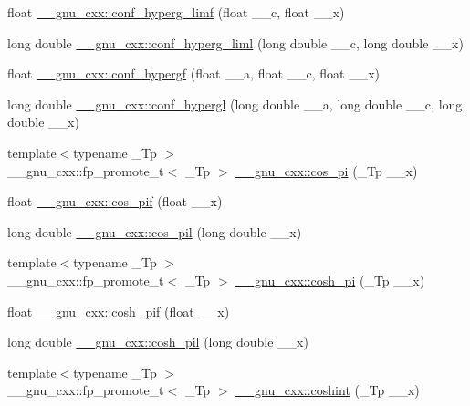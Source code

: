 \begin{DoxyCompactItemize}
\item 
float \hyperlink{group__gnu__math__spec__func_ga609879a370bc4e9fc70563806bc49cb9}{\+\_\+\+\_\+gnu\+\_\+cxx\+::conf\+\_\+hyperg\+\_\+limf} (float \+\_\+\+\_\+c, float \+\_\+\+\_\+x)
\item 
long double \hyperlink{group__gnu__math__spec__func_ga367be9b77eb1f9ccc2971d5300da48d1}{\+\_\+\+\_\+gnu\+\_\+cxx\+::conf\+\_\+hyperg\+\_\+liml} (long double \+\_\+\+\_\+c, long double \+\_\+\+\_\+x)
\item 
float \hyperlink{group__gnu__math__spec__func_gabd18e600aa78c3f2b2f835039506c810}{\+\_\+\+\_\+gnu\+\_\+cxx\+::conf\+\_\+hypergf} (float \+\_\+\+\_\+a, float \+\_\+\+\_\+c, float \+\_\+\+\_\+x)
\item 
long double \hyperlink{group__gnu__math__spec__func_ga0a9853f30d8fa515a12cd45a92da832e}{\+\_\+\+\_\+gnu\+\_\+cxx\+::conf\+\_\+hypergl} (long double \+\_\+\+\_\+a, long double \+\_\+\+\_\+c, long double \+\_\+\+\_\+x)
\item 
{\footnotesize template$<$typename \+\_\+\+Tp $>$ }\\\+\_\+\+\_\+gnu\+\_\+cxx\+::fp\+\_\+promote\+\_\+t$<$ \+\_\+\+Tp $>$ \hyperlink{group__gnu__math__spec__func_gafc4698ae591b0e9e61285b0794d43ef4}{\+\_\+\+\_\+gnu\+\_\+cxx\+::cos\+\_\+pi} (\+\_\+\+Tp \+\_\+\+\_\+x)
\item 
float \hyperlink{group__gnu__math__spec__func_gaddcae99c1572af6fa1d79b9cfa053033}{\+\_\+\+\_\+gnu\+\_\+cxx\+::cos\+\_\+pif} (float \+\_\+\+\_\+x)
\item 
long double \hyperlink{group__gnu__math__spec__func_ga9b6816c0abf30fd88417d79a33cb5465}{\+\_\+\+\_\+gnu\+\_\+cxx\+::cos\+\_\+pil} (long double \+\_\+\+\_\+x)
\item 
{\footnotesize template$<$typename \+\_\+\+Tp $>$ }\\\+\_\+\+\_\+gnu\+\_\+cxx\+::fp\+\_\+promote\+\_\+t$<$ \+\_\+\+Tp $>$ \hyperlink{group__gnu__math__spec__func_gaf59c68a01adfdab0f22c4fb405ab2a36}{\+\_\+\+\_\+gnu\+\_\+cxx\+::cosh\+\_\+pi} (\+\_\+\+Tp \+\_\+\+\_\+x)
\item 
float \hyperlink{group__gnu__math__spec__func_ga79a2f5c9da96b5ea6c663d6efca24944}{\+\_\+\+\_\+gnu\+\_\+cxx\+::cosh\+\_\+pif} (float \+\_\+\+\_\+x)
\item 
long double \hyperlink{group__gnu__math__spec__func_gab7bf4f591dd35af2bdb88a8219f5e248}{\+\_\+\+\_\+gnu\+\_\+cxx\+::cosh\+\_\+pil} (long double \+\_\+\+\_\+x)
\item 
{\footnotesize template$<$typename \+\_\+\+Tp $>$ }\\\+\_\+\+\_\+gnu\+\_\+cxx\+::fp\+\_\+promote\+\_\+t$<$ \+\_\+\+Tp $>$ \hyperlink{group__gnu__math__spec__func_ga2411d513d418180285ace6650c7b7e31}{\+\_\+\+\_\+gnu\+\_\+cxx\+::coshint} (\+\_\+\+Tp \+\_\+\+\_\+x)

\end{DoxyCompactItemize}
